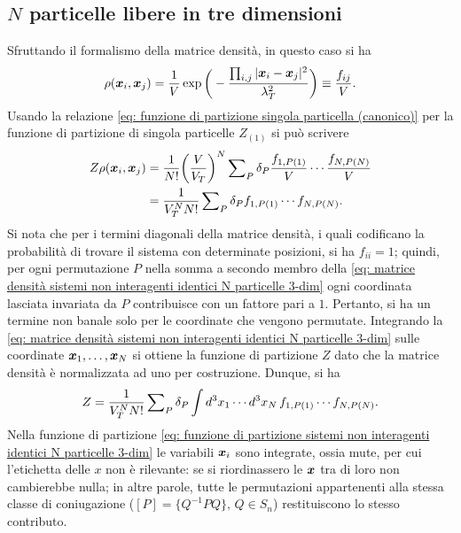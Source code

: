 \subsection{\texorpdfstring{$N$}{N} particelle libere in tre dimensioni}
Sfruttando il formalismo della matrice densità, in questo caso si ha
\begin{equation}
    \rho(\bm{x}_i,\bm{x}_j) = \frac{1}{V}\exp{\bigg(-\frac{\prod_{i,j}|\bm{x}_i - \bm{x}_j|^2}{\lambda_T^2}\bigg)} \equiv \frac{f_{ij}}{V}.
\end{equation}
Usando la relazione \eqref{eq: funzione di partizione singola particella (canonico)} per la funzione di partizione di singola particelle $Z_{(1)}$ si può scrivere
\begin{equation}
\label{eq: matrice densità sistemi non interagenti identici N particelle 3-dim}
    \begin{split}
        Z\rho(\bm{x}_i,\bm{x}_j) &= \frac{1}{N!}\bigg(\frac{V}{V_T}\bigg)^N\sum\nolimits_P\delta_P\frac{f_{1,P(1)}}{V}\cdots\frac{f_{N,P(N)}}{V} \\
        &= \frac{1}{V_T^NN!}\sum\nolimits_P\delta_Pf_{1,P(1)}\cdots f_{N,P(N)}.
    \end{split}
\end{equation}
Si nota che per i termini diagonali della matrice densità, i quali codificano la probabilità di trovare il sistema con determinate posizioni, si ha $f_{ii} = 1$; quindi, per ogni permutazione $P$ nella somma a secondo membro della \eqref{eq: matrice densità sistemi non interagenti identici N particelle 3-dim} ogni coordinata lasciata invariata da $P$ contribuisce con un fattore pari a $1$. Pertanto, si ha un termine non banale solo per le coordinate che vengono permutate. Integrando la \eqref{eq: matrice densità sistemi non interagenti identici N particelle 3-dim} sulle coordinate $\bm{x}_1,\dots,\bm{x}_N$ si ottiene la funzione di partizione $Z$ dato che la matrice densità è normalizzata ad uno per costruzione. Dunque, si ha
\begin{equation}
\label{eq: funzione di partizione sistemi non interagenti identici N particelle 3-dim}
    Z = \frac{1}{V_T^NN!}\sum\nolimits_P\delta_P\int d^3x_1\cdots d^3x_N\,f_{1,P(1)}\cdots f_{N,P(N)}.
\end{equation}
Nella funzione di partizione \eqref{eq: funzione di partizione sistemi non interagenti identici N particelle 3-dim} le variabili $\bm{x}_i$ sono integrate, ossia mute, per cui l'etichetta delle $x$ non è rilevante: se si riordinassero le $\bm{x}$ tra di loro non cambierebbe nulla; in altre parole, tutte le permutazioni appartenenti alla stessa classe di coniugazione ($[P] = \{Q^{-1}PQ\},\,Q\in S_n$) restituiscono lo stesso contributo. 
